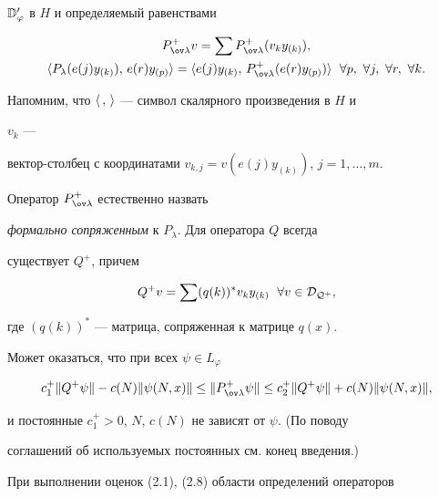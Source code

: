 $\Bbb D'_\varphi$ в $H$ и определяемый равенствами 


\begin{gather} 


P^+_{\ov\lambda}v=\sum P^+_{\ov\lambda}(v_k y_{(k)}),\\ 


%


\la P_\lambda(e(j)y_{(k)}),\,e(r)y_{(p)}\ra= 


\la e(j)y_{(k)},\,P^+_{\ov\lambda}(e(r)y_{(p)})\ra 


\ \; \forall p,\ \forall j,\ \forall r,\ \forall k. 


\end{gather} 


Напомним, что $\langle\,,\,\rangle$ --- символ скалярного произведения в $H$ и 


$v_k$ --- 


вектор-столбец с координатами $v_{k,j}=v(e(j)y_{(k)})$, $j=1,\dotsc,m$. 


Оператор $P^+_{\ov\lambda}$ естественно назвать 


{\it формально сопряженным} к $P_\lambda$. Для оператора $Q$ всегда 


существует $Q^+$, причем 


$$ 


Q^+v=\sum(q(k))^*v_k y_{(k)}\ \;\forall v\in\cal D_{Q^+}, 


$$ 


где $(q(k))^*$ --- матрица, сопряженная к матрице $q(x)$. 


 


Может оказаться, что при всех $\psi\in L_\varphi$ 


\begin{equation} 


c^+_1\|Q^+\psi\|-c(N)\|\psi(N,x)\|\le 


\|P^+_{\ov\lambda}\psi\|\le 


c^+_2\|Q^+\psi\|+c(N)\|\psi(N,x)\|, 


\end{equation} 


и постоянные $c^+_1>0$, $N$, $c(N)$ не зависят от $\psi$. (По поводу 


соглашений об используемых постоянных см. конец введения.) 


 


При выполнении оценок (2.1), (2.8) области определений операторов 


